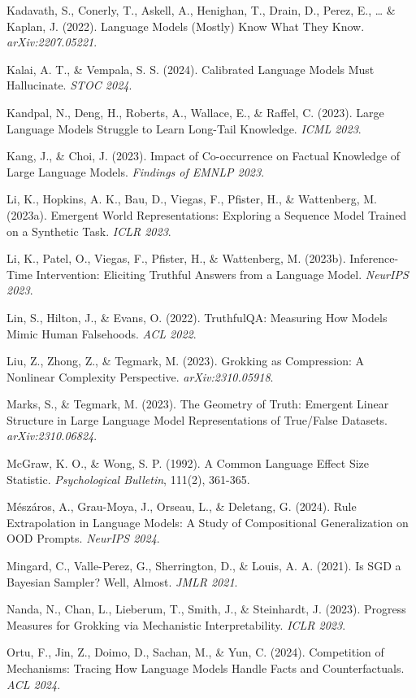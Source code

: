 \documentclass[
  11pt,
]{article}
\begin{document}
Kadavath, S., Conerly, T., Askell, A., Henighan, T., Drain, D., Perez,
E., \ldots{} \& Kaplan, J. (2022). Language Models (Mostly) Know What
They Know. \emph{arXiv:2207.05221}.

Kalai, A. T., \& Vempala, S. S. (2024). Calibrated Language Models Must
Hallucinate. \emph{STOC 2024}.

Kandpal, N., Deng, H., Roberts, A., Wallace, E., \& Raffel, C. (2023).
Large Language Models Struggle to Learn Long-Tail Knowledge. \emph{ICML
2023}.

Kang, J., \& Choi, J. (2023). Impact of Co-occurrence on Factual
Knowledge of Large Language Models. \emph{Findings of EMNLP 2023}.

Li, K., Hopkins, A. K., Bau, D., Viegas, F., Pfister, H., \& Wattenberg,
M. (2023a). Emergent World Representations: Exploring a Sequence Model
Trained on a Synthetic Task. \emph{ICLR 2023}.

Li, K., Patel, O., Viegas, F., Pfister, H., \& Wattenberg, M. (2023b).
Inference-Time Intervention: Eliciting Truthful Answers from a Language
Model. \emph{NeurIPS 2023}.

Lin, S., Hilton, J., \& Evans, O. (2022). TruthfulQA: Measuring How
Models Mimic Human Falsehoods. \emph{ACL 2022}.

Liu, Z., Zhong, Z., \& Tegmark, M. (2023). Grokking as Compression: A
Nonlinear Complexity Perspective. \emph{arXiv:2310.05918}.

Marks, S., \& Tegmark, M. (2023). The Geometry of Truth: Emergent Linear
Structure in Large Language Model Representations of True/False
Datasets. \emph{arXiv:2310.06824}.

McGraw, K. O., \& Wong, S. P. (1992). A Common Language Effect Size
Statistic. \emph{Psychological Bulletin}, 111(2), 361-365.

Mészáros, A., Grau-Moya, J., Orseau, L., \& Deletang, G. (2024). Rule
Extrapolation in Language Models: A Study of Compositional
Generalization on OOD Prompts. \emph{NeurIPS 2024}.

Mingard, C., Valle-Perez, G., Sherrington, D., \& Louis, A. A. (2021).
Is SGD a Bayesian Sampler? Well, Almost. \emph{JMLR 2021}.

Nanda, N., Chan, L., Lieberum, T., Smith, J., \& Steinhardt, J. (2023).
Progress Measures for Grokking via Mechanistic Interpretability.
\emph{ICLR 2023}.

Ortu, F., Jin, Z., Doimo, D., Sachan, M., \& Yun, C. (2024). Competition
of Mechanisms: Tracing How Language Models Handle Facts and
Counterfactuals. \emph{ACL 2024}.
\end{document}
